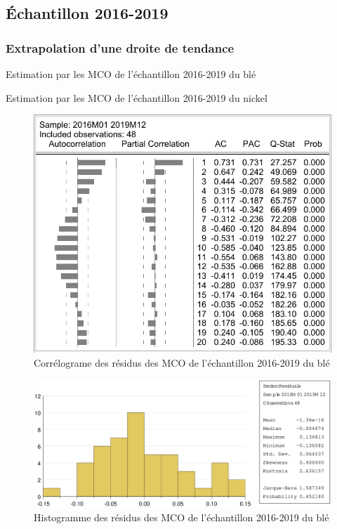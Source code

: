 \documentclass[12pt,a4paper]{article}
\begin{document}
\subsection{Échantillon 2016-2019}
\subsubsection{Extrapolation d'une droite de tendance}
\begin{table}[H]
    \centering
    \caption{Estimation par les MCO de l'échantillon 2016-2019 du blé}
    \sffamily
    \label{tab:mco_ble19}
    
\end{table}

\begin{table}[H]
    \centering
    \caption{Estimation par les MCO de l'échantillon 2016-2019 du nickel}
    \sffamily
    \label{tab:mco_nickel19}
    
\end{table}

\begin{figure}[H]
    \centering
    \label{fig:extra_cor_ble19}
    \includegraphics[]{annexe/3_1_extra_cor_ble19.pdf}
    \caption{Corrélograme des résidus des MCO de l'échantillon 2016-2019 du blé}
\end{figure}

\begin{figure}[H]
    \centering
    \includegraphics[width=\textwidth]{annexe/3_1_extra_hist_ble19.eps}
    \caption{Histogramme des résidus des MCO de l'échantillon 2016-2019 du blé}
    \label{fig:extra_hist_ble19}
\end{figure}
\end{document}
